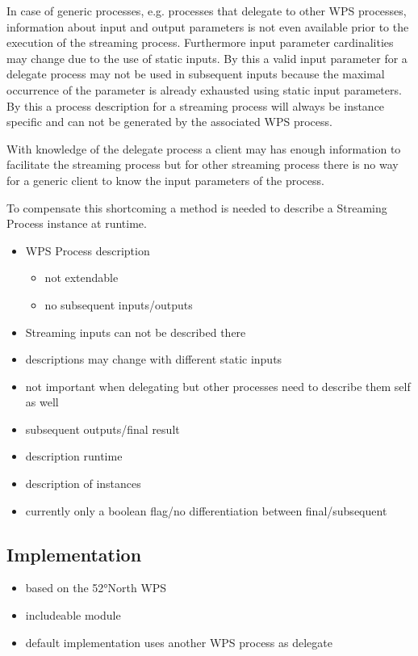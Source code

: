 		In case of generic processes, e.g. processes that delegate to other \ac{WPS} processes, information about input and output parameters is not even available prior to the execution of the streaming process. Furthermore input parameter cardinalities may change due to the use of static inputs. By this a valid input parameter for a delegate process may not be used in subsequent inputs because the maximal occurrence of the parameter is already exhausted using static input parameters. By this a process description for a streaming process will always be instance specific and can not be generated by the associated \ac{WPS} process.

		With knowledge of the delegate process a client may has enough information to facilitate the streaming process but for other streaming process there is no way for a generic client to know the input parameters of the process.

		To compensate this shortcoming a method is needed to describe a Streaming Process instance at runtime.
	\begin{itemize}
		\item WPS Process description
		\begin{itemize}
			\item not extendable
			\item no subsequent inputs/outputs
		\end{itemize}
		\item Streaming inputs can not be described there
		\item descriptions may change with different static inputs
		\item not important when delegating but other processes need to describe them self as well
		\item subsequent outputs/final result
		\item description runtime
		\item description of instances
		\item currently only a boolean flag/no differentiation between final/subsequent
	\end{itemize}

	\subsection{Implementation}
	\begin{itemize}
		\item based on the 52°North WPS
		\item includeable module
		\item default implementation uses another WPS process as delegate
	\end{itemize}
